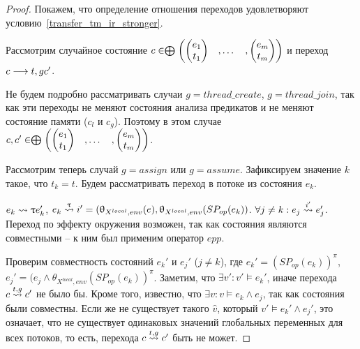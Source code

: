 \begin{proof}

Покажем, что определение отношения переходов удовлетворяют условию~\ref{transfer_tm_ir_stronger}. 

Рассмотрим случайное состояние $c \in \mathrel{\bigoplus}
\begin{pmatrix}
\begin{pmatrix}
e_1 \\
t_1 
\end{pmatrix}& ,
\dots& ,
\begin{pmatrix}
e_m \\
t_m 
\end{pmatrix}
\end{pmatrix}$ и переход $c \longrightarrow{t, g} c'$.

Не будем подробно рассматривать случаи $g = thread\_create$, $g = thread\_join$, так как эти переходы не меняют состояния анализа предикатов и не меняют состояние памяти ($c_l$ и $c_g$). Поэтому в этом случае $c, c' \in \mathrel{\bigoplus}
\begin{pmatrix}
\begin{pmatrix}
e_1 \\
t_1 
\end{pmatrix}& ,
\dots& ,
\begin{pmatrix}
e_m \\
t_m 
\end{pmatrix}
\end{pmatrix}$.

Рассмотрим теперь случай $g = assign$ или $g = assume$. Зафиксируем значение $k$ такое, что $t_k = t$. Будем рассматривать переход в потоке из состояния $e_k$.

$e_k \leadsto{\uptau} e_k'$, $e_k \stackrel{\uptau}{\leadsto} i' = (\uptheta_{X^{local},env}(e),\uptheta_{X^{local},env}(SP_{op}(e_k))$. 
$\forall j \neq k: e_j \stackrel{i'}{\leadsto} e_j'$.
Переход по эффекту окружения возможен, так как состояния являются совместными -- к ним был применим оператор $epp$.

Проверим совместность состояний $e_k'$ и $e_j'$ ($j \neq k$), где $e_k' = (SP_{op}(e_k))^\pi$, $e_j' = (e_j \land \theta_{X^{local},env}(SP_{op}(e_k))^\pi$. 
Заметим, что $\exists v': v' \models e_k'$, иначе перехода $c \stackrel{t, g}{\leadsto} c'$ не было бы.
Кроме того, известно, что $\exists v: v \models e_k \land e_j$, так как состояния были совместны.
Если же не существует такого $\widehat{v}$, который $v' \models e_k' \land e_j'$, это означает, что не существует одинаковых значений глобальных переменных для всех потоков, то есть, перехода $c \stackrel{t, g}{\leadsto} c'$ быть не может.


\end{proof}
